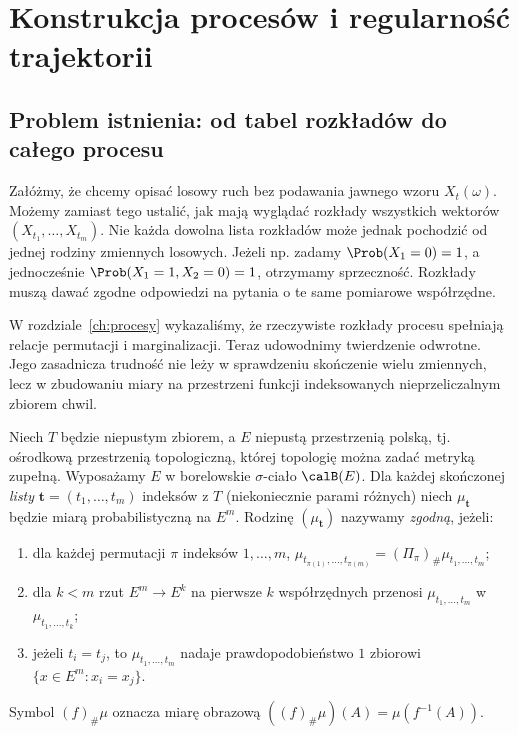 \chapter{Konstrukcja procesów i regularność trajektorii}
\label{ch:konstrukcja}

\section{Problem istnienia: od tabel rozkładów do całego procesu}
Załóżmy, że chcemy opisać losowy ruch bez podawania jawnego wzoru
$X_t(\omega)$. Możemy zamiast tego ustalić, jak mają wyglądać
rozkłady wszystkich wektorów
$(X_{t_1},\ldots,X_{t_m})$. Nie każda dowolna lista rozkładów
może jednak pochodzić od jednej rodziny zmiennych losowych.
Jeżeli np. zadamy $\Prob(X_1=0)=1$, a jednocześnie
$\Prob(X_1=1,X_2=0)=1$, otrzymamy sprzeczność.
Rozkłady muszą dawać zgodne odpowiedzi na pytania o te same
pomiarowe współrzędne.

W rozdziale~\ref{ch:procesy} wykazaliśmy, że rzeczywiste
rozkłady procesu spełniają relacje permutacji i marginalizacji.
Teraz udowodnimy twierdzenie odwrotne. Jego zasadnicza trudność
nie leży w sprawdzeniu skończenie wielu zmiennych, lecz w
zbudowaniu miary na przestrzeni funkcji indeksowanych
nieprzeliczalnym zbiorem chwil.

\begin{definicja}
Niech $T$ będzie niepustym zbiorem, a $E$ niepustą
przestrzenią polską, tj. ośrodkową przestrzenią topologiczną,
której topologię można zadać metryką zupełną.
Wyposażamy $E$ w borelowskie $\sigma$-ciało $\calB(E)$. Dla każdej skończonej
\emph{listy} $\mathbf t=(t_1,\ldots,t_m)$ indeksów z $T$
(niekoniecznie parami różnych) niech $\mu_{\mathbf t}$
będzie miarą probabilistyczną na $E^m$.
Rodzinę $(\mu_{\mathbf t})$ nazywamy \emph{zgodną}, jeżeli:
\begin{enumerate}
\item dla każdej permutacji $\pi$ indeksów $1,\ldots,m$,
$\mu_{t_{\pi(1)},\ldots,t_{\pi(m)}}=(\Pi_\pi)_\#\mu_{t_1,\ldots,t_m}$;
\item dla $k<m$ rzut $E^m\to E^k$ na pierwsze $k$ współrzędnych
przenosi $\mu_{t_1,\ldots,t_m}$ w $\mu_{t_1,\ldots,t_k}$;
\item jeżeli $t_i=t_j$, to $\mu_{t_1,\ldots,t_m}$ nadaje
prawdopodobieństwo $1$ zbiorowi $\{x\in E^m:x_i=x_j\}$.
\end{enumerate}
Symbol $(f)_\#\mu$ oznacza miarę obrazową
$((f)_\#\mu)(A)=\mu(f^{-1}(A))$.
\end{definicja}

